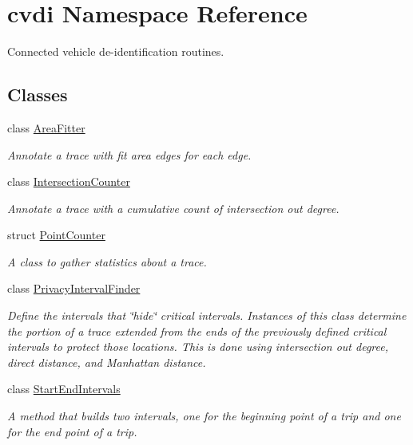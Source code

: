 \hypertarget{namespacecvdi}{}\section{cvdi Namespace Reference}
\label{namespacecvdi}


Connected vehicle de-\/identification routines.  


\subsection*{Classes}
\begin{DoxyCompactItemize}
\item 
class \hyperlink{classcvdi_1_1AreaFitter}{Area\+Fitter}
\begin{DoxyCompactList}\small\item\em Annotate a trace with fit area edges for each edge. \end{DoxyCompactList}\item 
class \hyperlink{classcvdi_1_1IntersectionCounter}{Intersection\+Counter}
\begin{DoxyCompactList}\small\item\em Annotate a trace with a cumulative count of intersection out degree. \end{DoxyCompactList}\item 
struct \hyperlink{structcvdi_1_1PointCounter}{Point\+Counter}
\begin{DoxyCompactList}\small\item\em A class to gather statistics about a trace. \end{DoxyCompactList}\item 
class \hyperlink{classcvdi_1_1PrivacyIntervalFinder}{Privacy\+Interval\+Finder}
\begin{DoxyCompactList}\small\item\em Define the intervals that \char`\"{}hide\char`\"{} critical intervals. Instances of this class determine the portion of a trace extended from the ends of the previously defined critical intervals to protect those locations. This is done using intersection out degree, direct distance, and Manhattan distance. \end{DoxyCompactList}\item 
class \hyperlink{classcvdi_1_1StartEndIntervals}{Start\+End\+Intervals}
\begin{DoxyCompactList}\small\item\em A method that builds two intervals, one for the beginning point of a trip and one for the end point of a trip. \end{DoxyCompactList}\item 

\end{DoxyCompactItemize}
